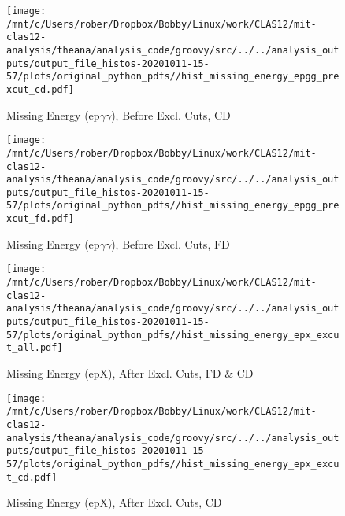 \documentclass{article}
\begin{document}
\begin{landscape}
    \begin{figure}[h]
        \centering

        \texttt{[image: /mnt/c/Users/rober/Dropbox/Bobby/Linux/work/CLAS12/mit-clas12-analysis/theana/analysis\_code/groovy/src/../../analysis\_outputs/output\_file\_histos-20201011-15-57/plots/original\_python\_pdfs//hist\_missing\_energy\_epgg\_prexcut\_cd.pdf]}
        \captionsetup{textformat=empty,labelformat=blank}
        \caption{Missing Energy (ep$\gamma$$\gamma$), Before Excl. Cuts, CD}
    \end{figure}
    \clearpage
    
    \begin{figure}[h]
        \centering

        \texttt{[image: /mnt/c/Users/rober/Dropbox/Bobby/Linux/work/CLAS12/mit-clas12-analysis/theana/analysis\_code/groovy/src/../../analysis\_outputs/output\_file\_histos-20201011-15-57/plots/original\_python\_pdfs//hist\_missing\_energy\_epgg\_prexcut\_fd.pdf]}
        \captionsetup{textformat=empty,labelformat=blank}
        \caption{Missing Energy (ep$\gamma$$\gamma$), Before Excl. Cuts, FD}
    \end{figure}
    \clearpage
    
    \begin{figure}[h]
        \centering

        \texttt{[image: /mnt/c/Users/rober/Dropbox/Bobby/Linux/work/CLAS12/mit-clas12-analysis/theana/analysis\_code/groovy/src/../../analysis\_outputs/output\_file\_histos-20201011-15-57/plots/original\_python\_pdfs//hist\_missing\_energy\_epx\_excut\_all.pdf]}
        \captionsetup{textformat=empty,labelformat=blank}
        \caption{Missing Energy (epX), After Excl. Cuts, FD \& CD}
    \end{figure}
    \clearpage
    
    \begin{figure}[h]
        \centering

        \texttt{[image: /mnt/c/Users/rober/Dropbox/Bobby/Linux/work/CLAS12/mit-clas12-analysis/theana/analysis\_code/groovy/src/../../analysis\_outputs/output\_file\_histos-20201011-15-57/plots/original\_python\_pdfs//hist\_missing\_energy\_epx\_excut\_cd.pdf]}
        \captionsetup{textformat=empty,labelformat=blank}
        \caption{Missing Energy (epX), After Excl. Cuts, CD}
    \end{figure}
    \clearpage
    
    \begin{figure}[h]
        \centering


\end{figure}
\end{landscape}
\end{document}
